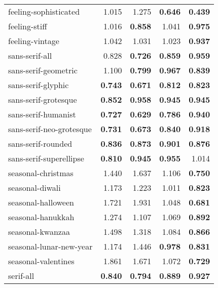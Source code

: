 \begin{longtable}{|l|r|r|r|r|}
feeling-sophisticated     & 1.015          & 1.275          & \textbf{0.646} & \textbf{0.439} \\
feeling-stiff             & 1.016          & \textbf{0.858} & 1.041          & \textbf{0.975} \\
feeling-vintage           & 1.042          & 1.031          & 1.023          & \textbf{0.937} \\
sans-serif-all            & 0.828          & \textbf{0.726} & \textbf{0.859} & \textbf{0.959} \\
sans-serif-geometric      & 1.100          & \textbf{0.799} & \textbf{0.967} & \textbf{0.839} \\
sans-serif-glyphic        & \textbf{0.743} & \textbf{0.671} & \textbf{0.812} & \textbf{0.823} \\
sans-serif-grotesque      & \textbf{0.852} & \textbf{0.958} & \textbf{0.945} & \textbf{0.945} \\
sans-serif-humanist       & \textbf{0.727} & \textbf{0.629} & \textbf{0.786} & \textbf{0.940} \\
sans-serif-neo-grotesque  & \textbf{0.731} & \textbf{0.673} & \textbf{0.840} & \textbf{0.918} \\
sans-serif-rounded        & \textbf{0.836} & \textbf{0.873} & \textbf{0.901} & \textbf{0.876} \\
sans-serif-superellipse   & \textbf{0.810} & \textbf{0.945} & \textbf{0.955} & 1.014          \\
seasonal-christmas        & 1.440          & 1.637          & 1.106          & \textbf{0.750} \\
seasonal-diwali           & 1.173          & 1.223          & 1.011          & \textbf{0.823} \\
seasonal-halloween        & 1.721          & 1.931          & 1.048          & \textbf{0.681} \\
seasonal-hanukkah         & 1.274          & 1.107          & 1.069          & \textbf{0.892} \\
seasonal-kwanzaa          & 1.498          & 1.318          & 1.084          & \textbf{0.866} \\
seasonal-lunar-new-year   & 1.174          & 1.446          & \textbf{0.978} & \textbf{0.831} \\
seasonal-valentines       & 1.861          & 1.671          & 1.072          & \textbf{0.729} \\
serif-all                 & \textbf{0.840} & \textbf{0.794} & \textbf{0.889} & \textbf{0.927} \\

\end{longtable}

